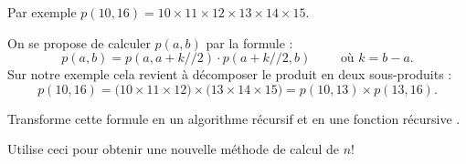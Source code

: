 \documentclass[11pt,class=report,crop=false]{standalone}
\begin{document}
\begin{activite}
\begin{enumerate}
  Par exemple $p(10,16) = 10 \times 11 \times 12 \times 13 \times 14 \times 15$.
  
  On se propose de calculer $p(a,b)$ par la formule :
  $$p(a,b) = p(a,a+k//2) \cdot p(a+k//2,b) \qquad \text{ où } k = b-a.$$
  Sur notre exemple cela revient à décomposer le produit en deux sous-produits :
  $$p(10,16) = \big(10 \times 11 \times 12\big) \times \big(13 \times 14 \times 15\big) = p(10,13) \times p(13,16).$$
  
  
  Transforme cette formule en un algorithme récursif et en une fonction récursive .
  
  Utilise ceci pour obtenir une nouvelle méthode de calcul de $n!$
  
  
  
\end{enumerate}
 
\end{activite}



\end{document}
